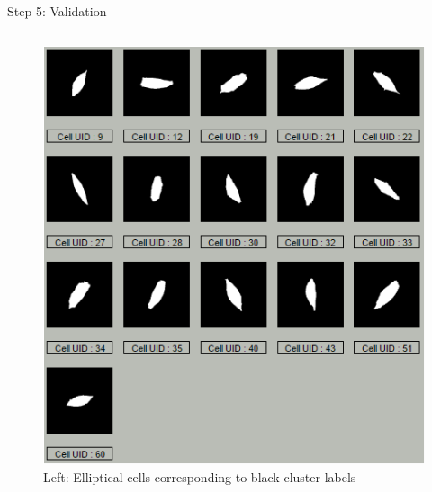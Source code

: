 \documentclass[final,hyperref={pdfpagelabels=false}]{beamer}
\begin{document}
\begin{frame}[t]
\begin{columns}[t]
\begin{column}{.465\textwidth}
\begin{block}{Step 5: Validation}
\begin{columns}
\begin{column}{.48\textwidth}
\centering
\begin{figure}
\includegraphics[width=0.99\linewidth]{cluster_fig1.png}
\captionsetup{justification=raggedright,singlelinecheck=false,labelformat=empty}
\caption{Left: Elliptical cells corresponding to black cluster labels}
\end{figure}
\end{column}


\end{columns}
\end{block}
\end{column}
\end{columns}
\end{frame}
\end{document}
